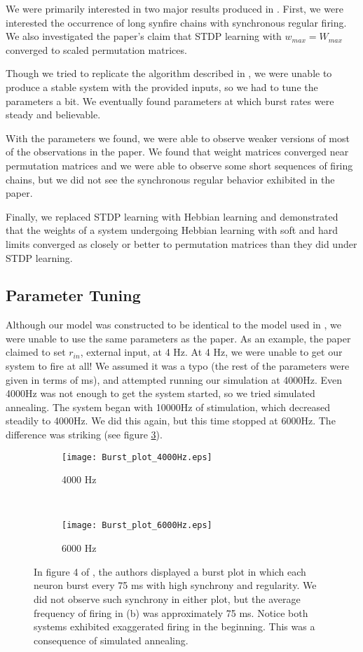 We were primarily interested in two major results produced in \cite{Fiete}. First, we were interested the occurrence of long synfire chains with synchronous regular firing. We also investigated the paper's claim that STDP learning with \(w_{max} = W_{max}\) converged to scaled permutation matrices.

Though we tried to replicate the algorithm described in \cite{Fiete}, we were unable to produce a stable system with the provided inputs, so we had to tune the parameters a bit. We eventually found parameters at which burst rates were steady and believable. 

With the parameters we found, we were able to observe weaker versions of most of the observations in the paper. We found that weight matrices converged near permutation matrices and we were able to observe some short sequences of firing chains, but we did not see the synchronous regular behavior exhibited in the paper.

Finally, we replaced STDP learning with Hebbian learning and demonstrated that the weights of a system undergoing Hebbian learning with soft and hard limits converged as closely or better to permutation matrices than they did under STDP learning.

\subsection{Parameter Tuning}

Although our model was constructed to be identical to the model used in \cite{Fiete}, we were unable to use the same parameters as the paper. As an example, the paper claimed to set \(r_{in}\), external input, at 4 Hz. At 4 Hz, we were unable to get our system to fire at all! We assumed it was a typo (the rest of the parameters were given in terms of ms), and attempted running our simulation at 4000Hz. Even 4000Hz was not enough to get the system started, so we tried simulated annealing. The system began with 10000Hz of stimulation, which decreased steadily to 4000Hz. We did this again, but this time stopped at 6000Hz. The difference was striking (see figure \ref{burstSTDP}). 

\begin{figure}[H]
\centering
\begin{subfigure}[b]{0.49\textwidth}
\texttt{[image: Burst\_plot\_4000Hz.eps]}
\caption{4000 Hz}
\label{burstSTDP:4000}
\end{subfigure}
\,
\begin{subfigure}[b]{0.49\textwidth}
\texttt{[image: Burst\_plot\_6000Hz.eps]}
\caption{6000 Hz}
\label{burstSTDP:6000}
\end{subfigure}
\caption{In figure 4 of \cite{Fiete}, the authors displayed a burst plot in which each neuron burst every 75 ms with high synchrony and regularity. We did not observe such synchrony in either plot, but the average frequency of firing in (b) was approximately 75 ms. Notice both systems exhibited exaggerated firing in the beginning. This was a consequence of simulated annealing.}
\label{burstSTDP}
\end{figure}

